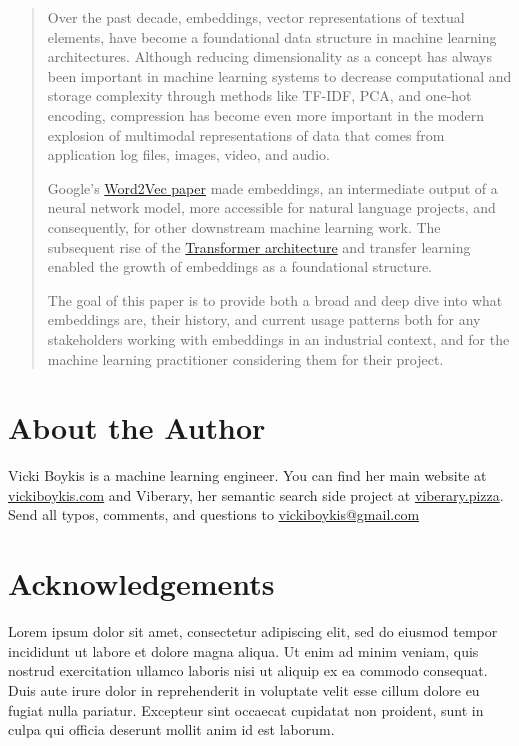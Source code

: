 \documentclass[11pt]{diazessay} %
\begin{document}
\begin{abstract}
Over the past decade, embeddings, vector representations of textual elements, have become a foundational data structure in machine learning architectures. Although reducing dimensionality as a concept has always been important in machine learning systems to decrease computational and storage complexity through methods like TF-IDF, PCA, and one-hot encoding, compression has become even more important in the modern explosion of multimodal representations of data that comes from application log files, images, video, and audio. 

Google's \href{https://arxiv.org/abs/1301.3781}{Word2Vec paper} made embeddings, an intermediate output of a neural network model, more accessible for natural language projects, and consequently, for other downstream machine learning work. The subsequent rise of the \href{https://arxiv.org/abs/1706.03762}{Transformer architecture} and transfer learning enabled the growth of embeddings as a foundational structure. 

The goal of this paper is to provide both a broad and deep dive into what embeddings are, their history, and current usage patterns both for any stakeholders working with embeddings in an industrial context, and for the machine learning practitioner considering them for their project. 

\end{abstract}

\section*{About the Author}

Vicki Boykis is a machine learning engineer. You can find her main website at \href{https://www.vickiboykis.com}{vickiboykis.com} and Viberary, her semantic search side project at \href{https://www.viberary.pizza}{viberary.pizza}. Send all typos, comments, and questions to \href{mailto:vickiboykis@gmail.com}{vickiboykis@gmail.com}


\section*{Acknowledgements}
Lorem ipsum dolor sit amet, consectetur adipiscing elit, sed do eiusmod tempor incididunt ut labore et dolore magna aliqua. Ut enim ad minim veniam, quis nostrud exercitation ullamco laboris nisi ut aliquip ex ea commodo consequat. Duis aute irure dolor in reprehenderit in voluptate velit esse cillum dolore eu fugiat nulla pariatur. Excepteur sint occaecat cupidatat non proident, sunt in culpa qui officia deserunt mollit anim id est laborum.
\end{document}
